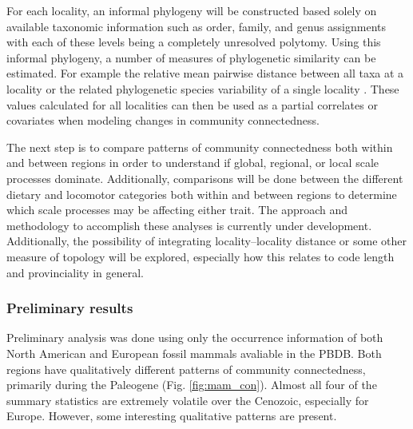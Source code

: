 \documentclass[12pt,letterpaper]{article}
\begin{document}
For each locality, an informal phylogeny will be constructed based solely on available taxonomic information such as order, family, and genus assignments with each of these levels being a completely unresolved polytomy. Using this informal phylogeny, a number of measures of phylogenetic similarity can be estimated. For example the relative mean pairwise distance between all taxa at a locality \citep{Webb2002} or the related phylogenetic species variability of a single locality \citet{Helmus2007a}. These values calculated for all localities can then be used as a partial correlates or covariates when modeling changes in community connectedness.

The next step is to compare patterns of community connectedness both within and between regions in order to understand if global, regional, or local scale processes dominate. Additionally, comparisons will be done between the different dietary and locomotor categories both within and between regions to determine which scale processes may be affecting either trait. The approach and methodology to accomplish these analyses is currently under development. Additionally, the possibility of integrating locality--locality distance or some other measure of topology will be explored, especially how this relates to code length and provinciality in general.


\subsubsection{Preliminary results} \label{mamcomres}
Preliminary analysis was done using only the occurrence information of both North American and European fossil mammals avaliable in the PBDB. Both regions have qualitatively different patterns of community connectedness, primarily during the Paleogene (Fig. \ref{fig:mam_con}). Almost all four of the summary statistics are extremely volatile over the Cenozoic, especially for Europe. However, some interesting qualitative patterns are present.
\end{document}
